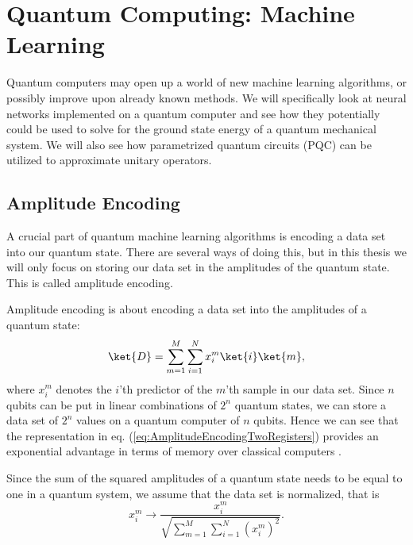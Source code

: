 \chapter{Quantum Computing: Machine Learning}
\label{chap:QuantumComputingML}
Quantum computers may open up a world of new machine learning algorithms, or possibly improve upon already known methods. We will specifically look at neural networks implemented on a quantum computer and see how they potentially could be used to solve for the ground state energy of a quantum mechanical system. We will also see how parametrized quantum circuits (PQC) can be utilized to approximate unitary operators.
\section{Amplitude Encoding}
\label{sec:AmplitudeEncoding}

A crucial part of quantum machine learning algorithms is encoding a data set into our quantum state. There are several ways of doing this, but in this thesis we will only focus on storing our data set in the amplitudes of the quantum state. This is called amplitude encoding.

Amplitude encoding is about encoding a data set into the amplitudes of a quantum state:
\begin{equation}
    \label{eq:AmplitudeEncodingTwoRegisters}
    \ket{D} = \sum_{m=1}^M \sum_{i=1}^N x_i^m\ket{i}\ket{m},
\end{equation}
where $x_i^m$ denotes the $i$'th predictor of the $m$'th sample in our data set.
Since $n$ qubits can be put in linear combinations of $2^n$ quantum states, we can store a data set of $2^n$ values on a quantum computer of $n$ qubits. Hence we can see that the representation in eq. (\ref{eq:AmplitudeEncodingTwoRegisters}) provides an exponential advantage in terms of memory over classical computers \cite{PQC}.

Since the sum of the squared amplitudes of a quantum state needs to be equal to one in a quantum system, we assume that the data set is normalized, that is
$$
x_i^m \rightarrow \frac{x_i^m}{\sqrt{\sum_{m=1}^M\sum_{i=1}^N(x_i^m)^2}}.
$$
 
